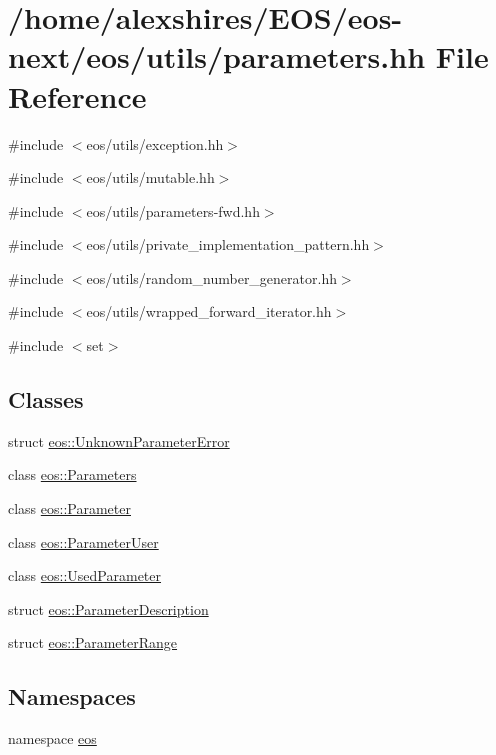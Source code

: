 \hypertarget{parameters_8hh}{
\section{/home/alexshires/EOS/eos-\/next/eos/utils/parameters.hh File Reference}
\label{parameters_8hh}
}
{\ttfamily \#include $<$eos/utils/exception.hh$>$}\par
{\ttfamily \#include $<$eos/utils/mutable.hh$>$}\par
{\ttfamily \#include $<$eos/utils/parameters-\/fwd.hh$>$}\par
{\ttfamily \#include $<$eos/utils/private\_\-implementation\_\-pattern.hh$>$}\par
{\ttfamily \#include $<$eos/utils/random\_\-number\_\-generator.hh$>$}\par
{\ttfamily \#include $<$eos/utils/wrapped\_\-forward\_\-iterator.hh$>$}\par
{\ttfamily \#include $<$set$>$}\par
\subsection*{Classes}
\begin{DoxyCompactItemize}
\item 
struct \hyperlink{structeos_1_1UnknownParameterError}{eos::UnknownParameterError}
\item 
class \hyperlink{classeos_1_1Parameters}{eos::Parameters}
\item 
class \hyperlink{classeos_1_1Parameter}{eos::Parameter}
\item 
class \hyperlink{classeos_1_1ParameterUser}{eos::ParameterUser}
\item 
class \hyperlink{classeos_1_1UsedParameter}{eos::UsedParameter}
\item 
struct \hyperlink{structeos_1_1ParameterDescription}{eos::ParameterDescription}
\item 
struct \hyperlink{structeos_1_1ParameterRange}{eos::ParameterRange}
\end{DoxyCompactItemize}
\subsection*{Namespaces}
\begin{DoxyCompactItemize}
\item 
namespace \hyperlink{namespaceeos}{eos}
\end{DoxyCompactItemize}
